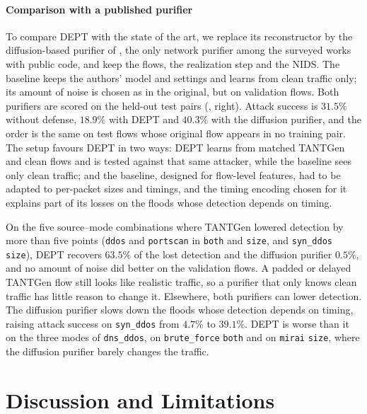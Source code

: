 \documentclass[acmtog,nonacm,pbalance]{acmart}
\newcommand{\src}[1]{\texttt{#1}}
\newcommand{\dmode}[1]{\texttt{#1}}
\begin{document}
\paragraph{Comparison with a published purifier} To compare DEPT with the state
of the art, we replace its reconstructor by the diffusion-based purifier of
\citet{merzouk2024diffusion}, the only network purifier among the surveyed works
with public code, and keep the flows, the realization step and the NIDS. The
baseline keeps the authors' model and settings and learns from clean traffic
only; its amount of noise is chosen as in the original, but on validation
flows. Both
purifiers are scored on the held-out test pairs (, right). Attack
success is $31.5\%$ without defense, $18.9\%$ with DEPT and $40.3\%$ with the
diffusion purifier, and the order is the same on test flows whose original flow
appears in no training pair. The setup favours DEPT in two ways: DEPT learns from
matched TANTGen and clean flows and is tested against that same attacker, while
the baseline sees only clean traffic; and the baseline, designed for flow-level
features, had to be adapted to per-packet sizes and timings, and the timing
encoding chosen for it explains part of its losses on the floods whose
detection depends on timing.

On the five source--mode combinations where TANTGen lowered detection by more
than five points (\src{ddos} and \src{portscan} in \dmode{both} and \dmode{size},
and \src{syn\_ddos} \dmode{size}), DEPT recovers $63.5\%$ of the lost detection
and the diffusion purifier $0.5\%$, and no amount of noise did better on the
validation flows. A padded or delayed TANTGen flow still looks like realistic
traffic, so a purifier that only knows clean traffic has little reason to change
it. Elsewhere, both purifiers can lower detection. The diffusion purifier slows
down the floods whose detection depends on timing, raising attack success on
\src{syn\_ddos} from $4.7\%$ to $39.1\%$. DEPT is worse than it on the three
modes of \src{dns\_ddos}, on \src{brute\_force} \dmode{both} and on \src{mirai}
\dmode{size}, where the diffusion purifier barely changes the traffic.

\section{Discussion and Limitations}\label{sec:discussion}
\end{document}
